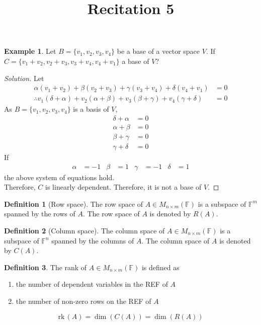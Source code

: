\documentclass[fleqn, a4paper, 12pt]{article}
\title{Recitation 5}
\author{}
\date{\formatdate{26}{11}{2014}}
\newcommand{\rank}{\mathrm{rk\,}}
\theoremstyle{definition}
\newtheorem{example}{Example}
\newtheorem{definition}{Definition}
\theoremstyle{theorem}
\newenvironment{solution}
{\begin{proof}[Solution]\let\qed\relax}
	{\end{proof}}
\begin{document}
\maketitle

\tableofcontents

\newpage
\section{}

\begin{example}
	Let $B = \{v_1, v_2, v_3, v_4\}$ be a base of a vector space $V$. If $C = \{v_1 + v_2, v_2 + v_3, v_3 + v_4, v_4 + v_1\}$ a base of $V$?
	\begin{solution}
		Let
		\begin{align*}
			\alpha (v_1 + v_2) + \beta (v_2 + v_3) + \gamma (v_3 + v_4) + \delta (v_4 + v_1) &= 0\\
			\therefore v_1 (\delta + \alpha) + v_2 (\alpha + \beta) + v_3 (\beta + \gamma) + v_4 (\gamma + \delta) &= 0
		\end{align*}
		As $B = \{v_1, v_2, v_3, v_4\}$ is a basis of $V$,
		\begin{align*}
			\delta + \alpha &= 0\\
			\alpha + \beta &= 0\\
			\beta + \gamma &= 0\\
			\gamma + \delta &= 0
		\end{align*}
		If 
		\begin{align*}
			\alpha &= -1 & \beta &= 1 & \gamma &= -1 & \delta &= 1
		\end{align*}
		the above system of equations hold.\\
		Therefore, $C$ is linearly dependent. Therefore, it is not a base of $V$.	\end{solution}
\end{example}


\begin{definition}[Row space]
	The row space of $A \in M_{n \times m}(\mathbb{F})$ is a subspace of $\mathbb{F}^m$ spanned by the rows of $A$. The row space of $A$ is denoted by $R(A)$.
\end{definition}

\begin{definition}[Column space]
	The column space of $A \in M_{n \times m}(\mathbb{F})$ is a subspace of $\mathbb{F}^n$ spanned by the columns of $A$. The column space of $A$ is denoted by $C(A)$.
\end{definition}

\begin{definition}
	The rank of $A \in M_{n \times m}(\mathbb{F})$ is defined as
	\begin{enumerate}
		\item the number of dependent variables in the REF of $A$
		\item the number of non-zero rows on the REF of $A$
	\end{enumerate}
	\begin{equation*}
		\rank(A) = \dim (C(A)) = \dim (R(A))
	\end{equation*}
\end{definition}
\end{document}

